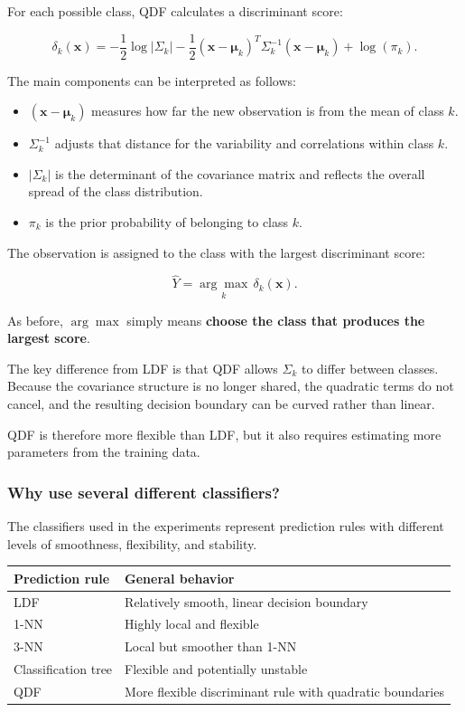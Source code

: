 \documentclass[
  letterpaper,
  DIV=11,
  numbers=noendperiod]{scrreprt}
\newcounter{none} %
\providecommand{\tightlist}{%
  \setlength{\itemsep}{0pt}\setlength{\parskip}{0pt}}
\begin{document}
For each possible class, QDF calculates a discriminant score:

\[
\delta_k(\mathbf{x})
=
-\frac{1}{2}\log|\Sigma_k|
-\frac{1}{2}
(\mathbf{x}-\boldsymbol{\mu}_k)^T
\Sigma_k^{-1}
(\mathbf{x}-\boldsymbol{\mu}_k)
+
\log(\pi_k).
\]

The main components can be interpreted as follows:

\begin{itemize}
\tightlist
\item
  \((\mathbf{x}-\boldsymbol{\mu}_k)\) measures how far the new
  observation is from the mean of class \(k\).
\item
  \(\Sigma_k^{-1}\) adjusts that distance for the variability and
  correlations within class \(k\).
\item
  \(|\Sigma_k|\) is the determinant of the covariance matrix and
  reflects the overall spread of the class distribution.
\item
  \(\pi_k\) is the prior probability of belonging to class \(k\).
\end{itemize}

The observation is assigned to the class with the largest discriminant
score:

\[
\widehat{Y}
=
\underset{k}{\arg\max}\,
\delta_k(\mathbf{x}).
\]

As before, \(\arg\max\) simply means \textbf{choose the class that
produces the largest score}.

The key difference from LDF is that QDF allows \(\Sigma_k\) to differ
between classes. Because the covariance structure is no longer shared,
the quadratic terms do not cancel, and the resulting decision boundary
can be curved rather than linear.

QDF is therefore more flexible than LDF, but it also requires estimating
more parameters from the training data.

\subsubsection{Why use several different
classifiers?}\label{why-use-several-different-classifiers}

The classifiers used in the experiments represent prediction rules with
different levels of smoothness, flexibility, and stability.

{\def\LTcaptype{none} %
\begin{longtable}[]{@{}ll@{}}
\toprule\noalign{}
Prediction rule & General behavior \\
\midrule\noalign{}
\endhead
\bottomrule\noalign{}
\endlastfoot
LDF & Relatively smooth, linear decision boundary \\
1-NN & Highly local and flexible \\
3-NN & Local but smoother than 1-NN \\
Classification tree & Flexible and potentially unstable \\
QDF & More flexible discriminant rule with quadratic boundaries \\
\end{longtable}
}
\end{document}
